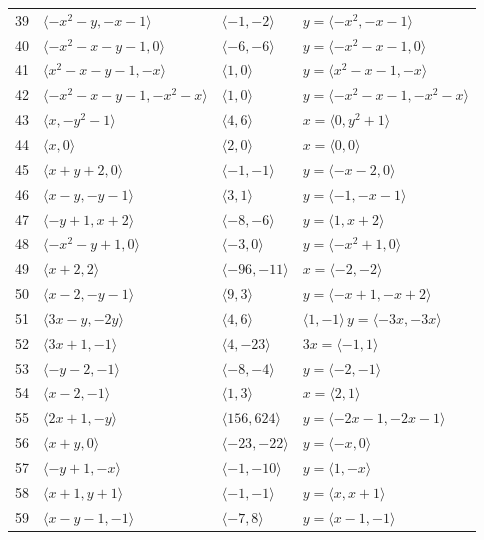 \documentclass[11pt]{article}
\begin{document}
\begin{longtable}{@{}rlll@{}}
39 & $\langle -x^{2}-y,-x-1\rangle$ & $\langle -1,-2\rangle$ & $y=\langle -x^{2},-x-1\rangle$\\
40 & $\langle -x^{2}-x-y-1,0\rangle$ & $\langle -6,-6\rangle$ & $y=\langle -x^{2}-x-1,0\rangle$\\
41 & $\langle x^{2}-x-y-1,-x\rangle$ & $\langle 1,0\rangle$ & $y=\langle x^{2}-x-1,-x\rangle$\\
42 & $\langle -x^{2}-x-y-1,-x^{2}-x\rangle$ & $\langle 1,0\rangle$ & $y=\langle -x^{2}-x-1,-x^{2}-x\rangle$\\
43 & $\langle x,-y^{2}-1\rangle$ & $\langle 4,6\rangle$ & $x=\langle 0,y^{2}+1\rangle$\\
44 & $\langle x,0\rangle$ & $\langle 2,0\rangle$ & $x=\langle 0,0\rangle$\\
45 & $\langle x+y+2,0\rangle$ & $\langle -1,-1\rangle$ & $y=\langle -x-2,0\rangle$\\
46 & $\langle x-y,-y-1\rangle$ & $\langle 3,1\rangle$ & $y=\langle -1,-x-1\rangle$\\
47 & $\langle -y+1,x+2\rangle$ & $\langle -8,-6\rangle$ & $y=\langle 1,x+2\rangle$\\
48 & $\langle -x^{2}-y+1,0\rangle$ & $\langle -3,0\rangle$ & $y=\langle -x^{2}+1,0\rangle$\\
49 & $\langle x+2,2\rangle$ & $\langle -96,-11\rangle$ & $x=\langle -2,-2\rangle$\\
50 & $\langle x-2,-y-1\rangle$ & $\langle 9,3\rangle$ & $y=\langle -x+1,-x+2\rangle$\\
51 & $\langle 3x-y,-2y\rangle$ & $\langle 4,6\rangle$ & $\langle 1,-1\rangle\,y=\langle -3x,-3x\rangle$\\
52 & $\langle 3x+1,-1\rangle$ & $\langle 4,-23\rangle$ & $3x=\langle -1,1\rangle$\\
53 & $\langle -y-2,-1\rangle$ & $\langle -8,-4\rangle$ & $y=\langle -2,-1\rangle$\\
54 & $\langle x-2,-1\rangle$ & $\langle 1,3\rangle$ & $x=\langle 2,1\rangle$\\
55 & $\langle 2x+1,-y\rangle$ & $\langle 156,624\rangle$ & $y=\langle -2x-1,-2x-1\rangle$\\
56 & $\langle x+y,0\rangle$ & $\langle -23,-22\rangle$ & $y=\langle -x,0\rangle$\\
57 & $\langle -y+1,-x\rangle$ & $\langle -1,-10\rangle$ & $y=\langle 1,-x\rangle$\\
58 & $\langle x+1,y+1\rangle$ & $\langle -1,-1\rangle$ & $y=\langle x,x+1\rangle$\\
59 & $\langle x-y-1,-1\rangle$ & $\langle -7,8\rangle$ & $y=\langle x-1,-1\rangle$\\

\end{longtable}
\end{document}

